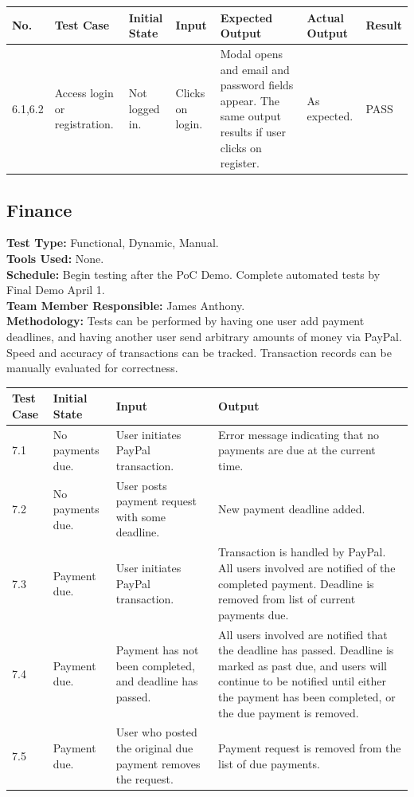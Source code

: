 \documentclass[12pt]{article}
\begin{document}
\begin{longtable}{|p{1.5cm}|p{1.5cm}|p{1.5cm}|p{2cm}|p{4cm}|p{2cm}|p{1.5cm}|}
\hline
\textbf{No.} & \textbf{Test Case}  & \textbf{Initial State} & \textbf{Input} & \textbf{Expected Output} & \textbf{Actual Output} & \textbf{Result}\\ 
\hline
6.1,6.2 & Access login or registration. & Not logged in. & Clicks on login. & Modal opens and email and password fields appear. The same output results if user clicks on register. & As expected. & PASS \\
\hline
\end{longtable}


\subsection{Finance}
\textbf{Test Type:} Functional, Dynamic, Manual. \\
\textbf{Tools Used:} None. \\
\textbf{Schedule:} Begin testing after the PoC Demo. Complete automated tests by Final Demo April 1. \\
\textbf{Team Member Responsible:} James Anthony. \\
\textbf{Methodology:} Tests can be performed by having one user add payment deadlines, and having another user send arbitrary amounts of money via PayPal. Speed and accuracy of transactions can be tracked. Transaction records can be manually evaluated for correctness.

\begin{longtable}{|p{2cm}|p{3cm}|p{5cm}|p{5cm}|}
\hline
\textbf{Test Case} & \textbf{Initial State} & \textbf{Input} & \textbf{Output} \\ \hline
7.1 & No payments due. & User initiates PayPal transaction. & Error message indicating that no payments are due at the current time.\\
\hline
7.2 & No payments due. & User posts payment request with some deadline. & New payment deadline added.\\
\hline
7.3 & Payment due. & User initiates PayPal transaction. & Transaction is handled by PayPal. All users involved are notified of the completed payment. Deadline is removed from list of current payments due.\\
\hline
7.4 & Payment due. & Payment has not been completed, and deadline has passed. & All users involved are notified that the deadline has passed. Deadline is marked as past due, and users will continue to be notified until either the payment has been completed, or the due payment is removed.\\
\hline
7.5 & Payment due. & User who posted the original due payment removes the request. & Payment request is removed from the list of due payments.\\
\hline
\end{longtable}
\end{document}
